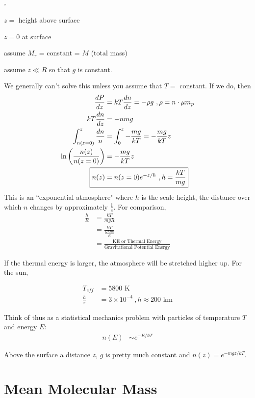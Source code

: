 \begin{list}{$^\circ$}{}
\item $z=$ height above surface
\item $z=0$ at surface
\item assume $M_r$ = constant = $M$ (total mass)
\item assume $z \ll R$ so that $g$ is constant. 
\end{list}
We generally can't solve this unless you assume that $T = $ constant. If we do, then
\begin{align}
\frac{dP}{dz} &= kT \frac{dn}{dz} = -\rho g~,\rho = n\cdot \mu m_p\\
kT \frac{dn}{dz} &= -nmg\\
\int_{n(z=0)}^z \frac{dn}{n} &= \int_0^z -\frac{mg}{kT} = -\frac{mg}{kT}z\\
\ln \lp \frac{n(z)}{n(z=0)} \rp &= -\frac{mg}{kT}z\\
\Aboxed{n(z) &= n(z=0)e^{-z/h}~, h=\frac{kT}{mg}}
\end{align}
This is an ``exponential atmosphere" where $h$ is the scale height, the distance over which $n$ changes by approximately $\frac{1}{e}$. For comparison,
\begin{align}
\frac{h}{R} &= \frac{kT}{mgR}\\
&= \frac{kT}{\frac{GMm}{R}}\\
&= \frac{\textrm{KE or Thermal Energy}}{\textrm{Gravitational Potential Energy}}
\end{align}

If the thermal energy is larger, the atmosphere will be stretched higher up. For the sun,

\begin{align}
T_{eff}&= 5800\textrm{ K}\\
\frac{h}{r} &= 3 \times 10^{-4}~, h \approx 200\textrm{ km}
\end{align}
 
 Think of thus as a statistical mechanics problem with particles of temperature $T$ and energy $E$:
 \begin{align}
n(E) &\sim e^{-E/kT}
\end{align}

Above the surface a distance $z$, $g$ is pretty much constant and $n(z) = e^{-mgz/kT}$. 

\section{Mean Molecular Mass}

